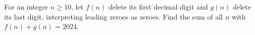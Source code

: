 For an integer $n\ge10$, let $f(n)$ delete its first decimal digit and $g(n)$ delete its last digit, interpreting leading zeroes as zeroes. Find the sum of all $n$ with $f(n)+g(n)=2024$.
